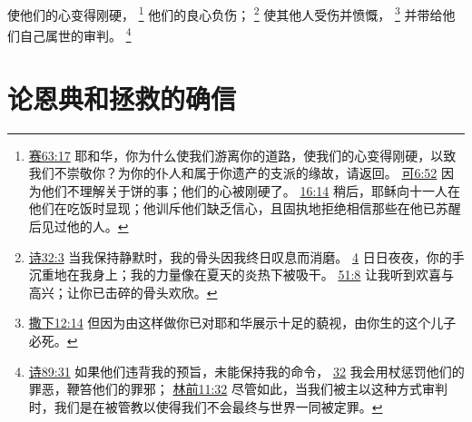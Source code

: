 \documentclass[12pt, a4paper, oneside]{ctexart}
\begin{document}
	使他们的心变得刚硬，
	\footnote {
		\href{https://biblehub.com/isaiah/63-17.htm}{赛63:17} 耶和华，你为什么使我们游离你的道路，使我们的心变得刚硬，以致我们不崇敬你？为你的仆人和属于你遗产的支派的缘故，请返回。
		\href{https://biblehub.com/mark/6-52.htm}{可6:52} 因为他们不理解关于饼的事；他们的心被刚硬了。
		\href{https://biblehub.com/mark/16-14.htm}{16:14} 稍后，耶稣向十一人在他们在吃饭时显现；他训斥他们缺乏信心，且固执地拒绝相信那些在他已苏醒后见过他的人。
	}
	他们的良心负伤；
	\footnote {
		\href{https://biblehub.com/psalms/32-3.htm}{诗32:3} 当我保持静默时，我的骨头因我终日叹息而消磨。
		\href{https://biblehub.com/psalms/32-4.htm}{4} 日日夜夜，你的手沉重地在我身上；我的力量像在夏天的炎热下被吸干。
		\href{https://biblehub.com/psalms/51-8.htm}{51:8} 让我听到欢喜与高兴；让你已击碎的骨头欢欣。
	}
	使其他人受伤并愤慨，
	\footnote {
		\href{https://biblehub.com/2_samuel/12-14.htm}{撒下12:14} 但因为由这样做你已对耶和华展示十足的藐视，由你生的这个儿子必死。
	}
	并带给他们自己属世的审判。
	\footnote {
		\href{https://biblehub.com/psalms/89-31.htm}{诗89:31} 如果他们违背我的预旨，未能保持我的命令，
		\href{https://biblehub.com/psalms/89-32.htm}{32} 我会用杖惩罚他们的罪恶，鞭笞他们的罪邪；
		\href{https://biblehub.com/1_corinthians/11-32.htm}{林前11:32} 尽管如此，当我们被主以这种方式审判时，我们是在被管教以使得我们不会最终与世界一同被定罪。
	}

\section{论恩典和拯救的确信}
\end{document}
